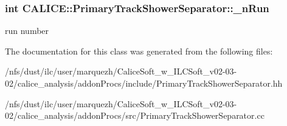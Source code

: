 \subsubsection[{\-\_\-n\-Run}]{\setlength{\rightskip}{0pt plus 5cm}int C\-A\-L\-I\-C\-E\-::\-Primary\-Track\-Shower\-Separator\-::\-\_\-n\-Run\hspace{0.3cm}{\ttfamily [protected]}}\label{classCALICE_1_1PrimaryTrackShowerSeparator_a47e4c719050473e3a174289c45a8ff06}
run number 

The documentation for this class was generated from the following files\-:\begin{DoxyCompactItemize}
\item 
/nfs/dust/ilc/user/marquezh/\-Calice\-Soft\-\_\-w\-\_\-\-I\-L\-C\-Soft\-\_\-v02-\/03-\/02/calice\-\_\-analysis/addon\-Procs/include/Primary\-Track\-Shower\-Separator.\-hh\item 
/nfs/dust/ilc/user/marquezh/\-Calice\-Soft\-\_\-w\-\_\-\-I\-L\-C\-Soft\-\_\-v02-\/03-\/02/calice\-\_\-analysis/addon\-Procs/src/Primary\-Track\-Shower\-Separator.\-cc\end{DoxyCompactItemize}
